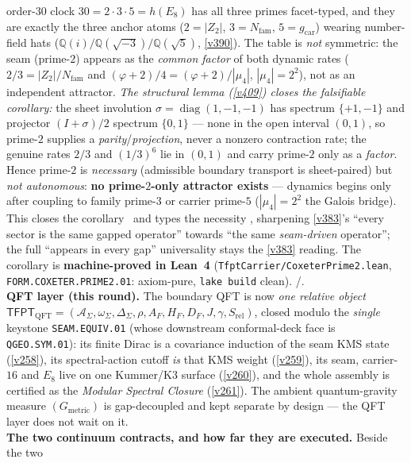\documentclass[11pt,a4paper]{article}
\newcommand{\Nfam}{N_{\mathrm{fam}}}
\newcommand{\gcar}{g_{\mathrm{car}}}
\begin{document}
\begin{keybox}
order-$30$ clock $30=2{\cdot}3{\cdot}5=h(E_8)$ has all three primes facet-typed, and they are exactly the three
anchor atoms ($2{=}|Z_2|$, $3{=}\Nfam$, $5{=}\gcar$) wearing number-field hats
($\mathbb Q(i)/\mathbb Q(\sqrt{-3})/\mathbb Q(\sqrt5)$, \vref{v390}). The table is \emph{not} symmetric: the seam
(prime-$2$) appears as the \emph{common factor} of both dynamic rates ($2/3=|Z_2|/\Nfam$ and
$(\varphi{+}2)/4=(\varphi{+}2)/|\mu_4|$, $|\mu_4|{=}2^2$), not as an independent attractor. \emph{The structural
lemma (\vref{v409}) closes the falsifiable corollary:} the sheet involution $\sigma{=}\operatorname{diag}(1,-1,-1)$
has spectrum $\{+1,-1\}$ and projector $(I{+}\sigma)/2$ spectrum $\{0,1\}$ --- none in the open interval $(0,1)$,
so prime-$2$ supplies a \emph{parity}/\emph{projection}, never a nonzero contraction rate; the genuine rates $2/3$
and $(1/3)^6$ lie in $(0,1)$ and carry prime-$2$ only as a \emph{factor}. Hence prime-$2$ is \emph{necessary}
(admissible boundary transport is sheet-paired) but \emph{not autonomous}: \textbf{no prime-$2$-only attractor
exists} --- dynamics begins only after coupling to family prime-$3$ or carrier prime-$5$ ($|\mu_4|{=}2^2$ the
Galois bridge). This closes the corollary \mE\ and types the necessity \mC, sharpening \vref{v383}'s ``every
sector is the same gapped operator'' towards ``the same \emph{seam-driven} operator''; the full ``appears in
every gap'' universality stays the \vref{v383} reading. The corollary is \textbf{machine-proved in Lean~4}
(\texttt{TfptCarrier/CoxeterPrime2.lean}, \texttt{FORM.COXETER.PRIME2.01}: axiom-pure, \texttt{lake build}
clean). \mE/\mC.
\smallskip\\
\noindent\textbf{QFT layer (this round).} The boundary QFT is now \emph{one relative object}
$\mathsf{TFPT}_{\mathrm{QFT}}=(\mathcal A_\Sigma,\omega_\Sigma,\Delta_\Sigma,\rho,A_F,H_F,D_F,J,\gamma,
S_{\mathrm{rel}})$, closed modulo the \emph{single} keystone \texttt{SEAM.EQUIV.01} (whose downstream
conformal-deck face is \texttt{QGEO.SYM.01}): its finite Dirac is a
covariance induction of the seam KMS state (\vref{v258}), its spectral-action cutoff \emph{is} that KMS
weight (\vref{v259}), its seam, carrier-$16$ and $E_8$ live on one Kummer/K3 surface (\vref{v260}), and the
whole assembly is certified as the \emph{Modular Spectral Closure} (\vref{v261}). The ambient
quantum-gravity measure $(G_{\mathrm{metric}})$ is gap-decoupled and kept separate by design --- the QFT
layer does not wait on it.
\smallskip\\
\noindent\textbf{The two continuum contracts, and how far they are executed.} Beside the two

\end{keybox}
\end{document}
